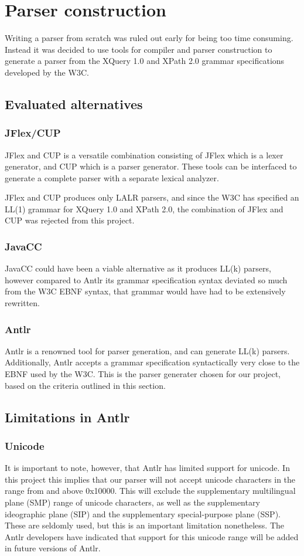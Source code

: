 \section{Parser construction}
Writing a parser from scratch was ruled out early for being too time consuming.
Instead it was decided to use tools for compiler and parser construction to
generate a parser from the XQuery 1.0 and XPath 2.0 grammar specifications
developed by the W3C.

\subsection{Evaluated alternatives}
\subsubsection{JFlex/CUP}
JFlex and CUP is a versatile combination consisting of JFlex which is a lexer
generator, and CUP which is a parser generator. These tools can be interfaced to
generate a complete parser with a separate lexical analyzer.

JFlex and CUP produces only LALR parsers, and since the W3C has specified an
LL(1) grammar for XQuery 1.0 and XPath 2.0, the combination of JFlex and CUP was
rejected from this project.

\subsubsection{JavaCC}
JavaCC could have been a viable alternative as it produces LL(k) parsers,
however compared to Antlr its grammar specification syntax deviated so much
from the W3C EBNF syntax, that grammar would have had to be extensively
rewritten.

\subsubsection{Antlr}
Antlr is a renowned tool for parser generation, and can generate LL(k) parsers.
Additionally, Antlr accepts a grammar specification syntactically very close to
the EBNF used by the W3C. This is the parser generater chosen for our project,
based on the criteria outlined in this section.

\subsection{Limitations in Antlr}
\subsubsection{Unicode}
It is important to note, however, that Antlr has limited support for unicode.
In this project this implies that our parser will not accept unicode characters
in the range from and above 0x10000. This will exclude the supplementary
multilingual plane (SMP) range of unicode characters, as well as the
supplementary ideographic plane (SIP) and the supplementary special-purpose
plane (SSP). These are seldomly used, but this is an important limitation
nonetheless. The Antlr developers have indicated that support for this unicode
range will be added in future versions of Antlr.

